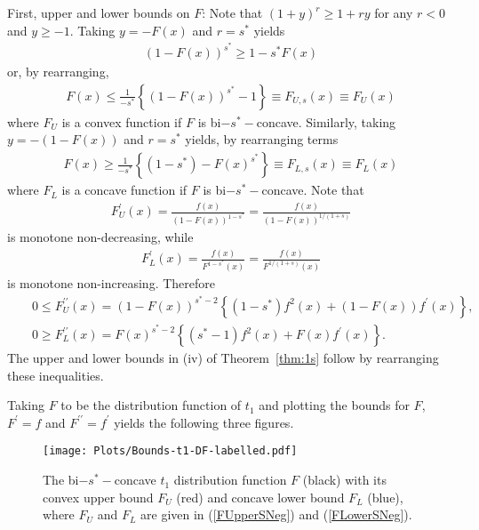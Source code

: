 \documentclass[11pt]{amsart}
\numberwithin{equation}{section}
\theoremstyle{definition}\newtheorem{definition}{Definition}
\theoremstyle{remark}\newtheorem{assumption}{Assumption}
\theoremstyle{remark}\newtheorem{remark}{Remark}
\theoremstyle{definition}\newtheorem{example}{Example}
\theoremstyle{plain}\newtheorem{question}{Question}
\theoremstyle{plain}\newtheorem{theorem}{Theorem}
\theoremstyle{plain}\newtheorem{lemma}{Lemma}
\theoremstyle{plain}\newtheorem{proposition}{Proposition}
\theoremstyle{plain}\newtheorem{corollary}{Corollary}
\theoremstyle{plain}\newtheorem{conjecture}{Conjecture}
\begin{document}
First, upper and lower bounds on $F$:   Note that $(1+y)^r \ge 1+ ry$ for any $r < 0$ and $y \ge -1$.
Taking $y = -F(x)$ and $r = s^*$ yields 
\begin{eqnarray*}
(1-F(x))^{s^*} \ge 1- s^* F(x) 
\end{eqnarray*}
or, by rearranging,
\begin{eqnarray}
F(x) \le \frac{1}{-s^*} \left \{ (1-F(x))^{s^*} - 1 \right \} \equiv F_{U,s} (x) \equiv F_U (x)
\label{FUpperSNeg}
\end{eqnarray}
where $F_U$ is a convex function if $F$ is bi$-s^*-$concave.  
Similarly, taking $y= - (1-F(x))$ and $r=s^*$ yields, by rearranging terms
\begin{eqnarray}
F(x) \ge \frac{1}{-s^*} \left \{ (1-s^*) - F(x)^{s^*} \right \} \equiv F_{L,s} (x) \equiv F_L (x) 
\label{FLowerSNeg}
\end{eqnarray}
where $F_L$ is a concave function if $F$ is bi$-s^*-$concave.  
Note that 
\begin{eqnarray}
F_U^{\prime} (x) =  \frac{f(x)}{(1-F(x))^{1-s^*}}  = \frac{f(x)}{(1-F(x))^{1/(1+s)}} 
\label{FprimeLowerSNeg}
\end{eqnarray}
is monotone non-decreasing, while
\begin{eqnarray}
 F_L^{\prime} (x)  =  \frac{f(x)}{F^{1-s^*}(x)}  = \frac{f(x)}{F^{1/(1+s)} (x)}  
\label{FprimeUpperSNeg}
\end{eqnarray} 
is monotone non-increasing.
Therefore 
\begin{eqnarray*}
&& 0 \le F_U^{\prime \prime} (x) =  (1-F(x))^{s^*-2} \left \{ (1-s^*) f^2 (x) + (1-F(x)) f^{\prime} (x) \right \}, \\
&& 0 \ge F_L^{\prime \prime} (x)  =   F(x)^{s^*-2} \left \{ (s^*-1) f^2 (x) + F(x) f^{\prime}(x) \right \} . 
\end{eqnarray*}
The upper and lower bounds in (iv) of Theorem~\ref{thm:1s} follow by rearranging these inequalities.

Taking $F$ to be the distribution function of  $t_1$ and plotting the bounds  for $F$, $F^{\prime} = f$ 
and $F^{\prime \prime} = f^{\prime}$ yields the following three figures.  

\begin{figure}[ht]
    \centering
    \texttt{[image: Plots/Bounds-t1-DF-labelled.pdf]}
    \caption{The bi$-s^*-$concave $t_1$ distribution function $F$ (black) with its  
    convex upper bound $F_U$ (red) and concave lower bound $F_L$ (blue), 
    where $F_U$ and $F_L$ are given in (\ref{FUpperSNeg}) and (\ref{FLowerSNeg}).}
    \label{fig:fig1}
 \end{figure}
\end{document}
